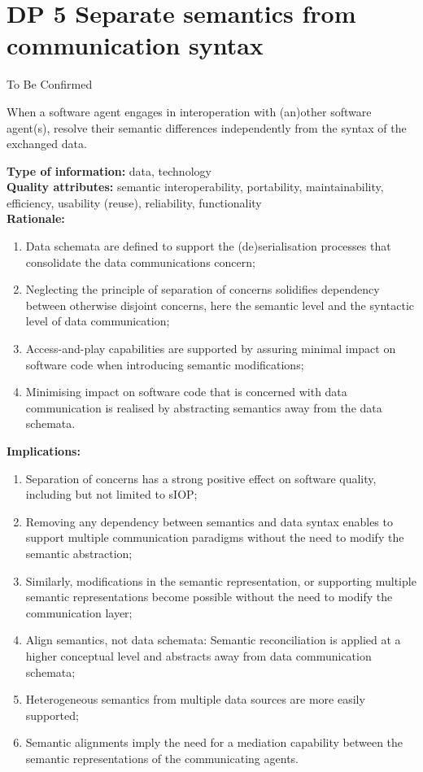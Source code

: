 \documentclass[sort&compress,preprint,authoryear,3p,twocolumn]{elsarticle}
\begin{document}
\hypertarget{dp-5-separate-semantics-from-communication-syntax}{%
\section{DP 5 Separate semantics from communication
syntax}\label{dp-5-separate-semantics-from-communication-syntax}}

To Be Confirmed

\begin{mmdp}\label{dp:ssoc}

When a software agent engages in interoperation with (an)other software agent(s), resolve their semantic differences independently from the syntax of the exchanged data.   

\textbf{Type of information:} data, technology  \\
\textbf{Quality attributes:} semantic interoperability, portability, maintainability, efficiency, usability (reuse), reliability, functionality   \\
\textbf{Rationale:}
\begin{enumerate}
  \item Data schemata are defined to support the (de)serialisation processes that consolidate the data communications concern;
  \item Neglecting the principle of separation of concerns solidifies dependency between otherwise disjoint concerns, here the semantic level and the syntactic level of data communication;
  \item Access-and-play capabilities are supported by assuring minimal impact on software code when introducing semantic modifications;
  \item Minimising impact on software code that is concerned with data communication is realised by abstracting semantics away from the data schemata.
\end{enumerate}
\textbf{Implications:}
\begin{enumerate}
  \item Separation of concerns has a strong positive effect on software quality, including but not limited to sIOP;
  \item Removing any dependency between semantics and data syntax enables to support multiple communication paradigms without the need to modify the semantic abstraction;
  \item Similarly, modifications in the semantic representation, or supporting multiple semantic representations become possible without the need to modify the communication layer;
  \item Align semantics, not data schemata: Semantic reconciliation is applied at a higher conceptual level and abstracts away from data communication schemata;
  \item Heterogeneous semantics from multiple data sources are more easily supported;
  \item Semantic alignments imply the need for a mediation capability between the semantic representations of the communicating agents.
\end{enumerate}  
\end{mmdp}
\end{document}
